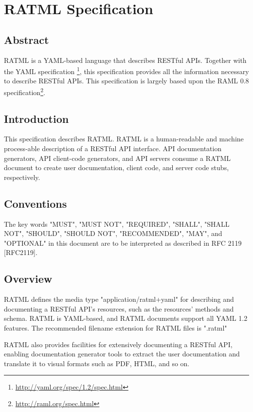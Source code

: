 \chapter{RATML Specification}


\section{Abstract}

RATML is a YAML-based language that describes RESTful APIs. Together with the YAML specification \footnote{\url{http://yaml.org/spec/1.2/spec.html}}, this specification provides all the information necessary to describe RESTful APIs. This specification is largely based upon the RAML 0.8 specification\footnote{\url{http://raml.org/spec.html}}.


\section{Introduction}

This specification describes RATML. RATML is a human-readable and machine process-able description of a RESTful API interface. API documentation generators, API client-code generators, and API servers consume a RATML document to create user documentation, client code, and server code stubs, respectively.

\section{Conventions}


The key words "MUST", "MUST NOT", "REQUIRED", "SHALL", "SHALL NOT", "SHOULD", "SHOULD NOT", "RECOMMENDED", "MAY", and "OPTIONAL" in this document are to be interpreted as described in RFC 2119 [RFC2119].

\section{Overview}

RATML defines the media type "application/ratml+yaml" for describing and documenting a RESTful API's resources, such as the resources' methods and schema. RATML is YAML-based, and RATML documents support all YAML 1.2 features. The recommended filename extension for RATML files is ".ratml"

RATML also provides facilities for extensively documenting a RESTful API, enabling documentation generator tools to extract the user documentation and translate it to visual formats such as PDF, HTML, and so on.


